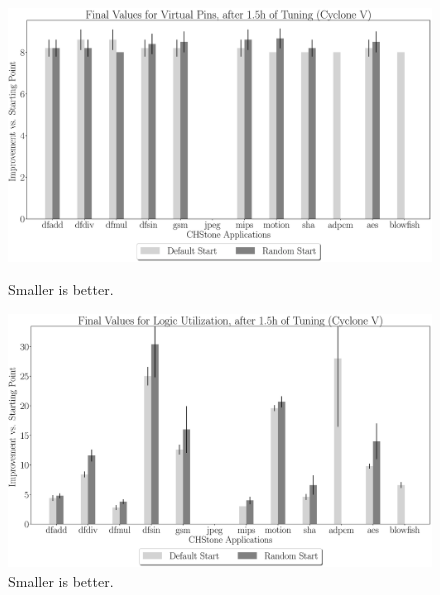 \documentclass[12pt, a4paper]{article}
\begin{document}
\begin{figure}[htpb]
    \begin{minipage}{.48\textwidth}
        \centering
        \includegraphics[width=.8\textwidth]{abs_comp_pins_5400_chstone_CycloneV}
        \caption{Smaller is better.}
    \end{minipage}%
    \begin{minipage}{.48\textwidth}
        \centering
        \includegraphics[width=.8\textwidth]{abs_comp_lu_5400_chstone_CycloneV}
        \caption{Smaller is better.}
    \end{minipage}%
\end{figure}
\end{document}

